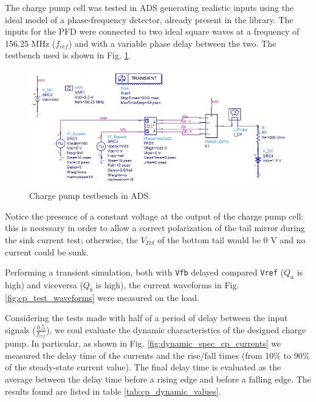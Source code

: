 \documentclass[lettersize,journal]{IEEEtran}
\begin{document}
The charge pump cell was tested in ADS generating realistic inputs using the ideal model of a phase-frequency detector, already present in the library. The inputs for the PFD were connected to two ideal square waves at a frequency of 156.25 MHz (\(f_{ref}\)) and with a variable phase delay between the two. The testbench used is shown in Fig. \ref{fig:cp_testbench_schematic}.

\begin{figure}[!ht]
    \centering
    \includegraphics[width=1\linewidth]{images/block_design/CP/cp_test_schematic.png}
    \caption{Charge pump testbench in ADS.}
    \label{fig:cp_testbench_schematic}
\end{figure}

Notice the presence of a constant voltage at the output of the charge pump cell: this is necessary in order to allow a correct polarization of the tail mirror during the sink current test; otherwise, the \(V_{DS}\) of the bottom tail would be 0 V and no current could be sunk.

Performing a transient simulation, both with \texttt{Vfb} delayed compared \texttt{Vref} (\(Q_a\) is high) and viceversa (\(Q_b\) is high), the current waveforms in Fig. \ref{fig:cp_test_waveforms} were measured on the load.

Considering the tests made with half of a period of delay between the input signals (\(\frac{0.5}{f_{ref}}\)), we coul evaluate the dynamic characteristics of the designed charge pump. In particular, as shown in Fig. \ref{fig:dynamic_spec_cp_currents} we measured the delay time of the currents and the rise/fall times (from 10\% to 90\% of the steady-state current value). The final delay time is evaluated as the average between the delay time before a rising edge and before a falling edge. The results found are listed in table \ref{tab:cp_dynamic_values}.
\end{document}
